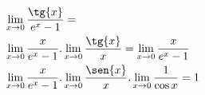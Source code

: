 \begin{ex}
\begin{align}
&\lim_{x\rightarrow 0} \frac{\tg{x}}{e^{x}-1}=\nonumber\\
&\lim_{x\rightarrow 0} \frac{x}{e^{x}-1}.\lim_{x\rightarrow 0} \frac{\tg{x}}{x}=\lim_{x\rightarrow 0} \frac{x}{e^{x}-1}\nonumber\\
&\lim_{x\rightarrow 0} \frac{x}{e^{x}-1}.\lim_{x\rightarrow 0} \frac{\sen{x}}{x}.\lim_{x\rightarrow 0} \frac{1}{\cos{x}}=1\nonumber
\end{align}
\end{ex}